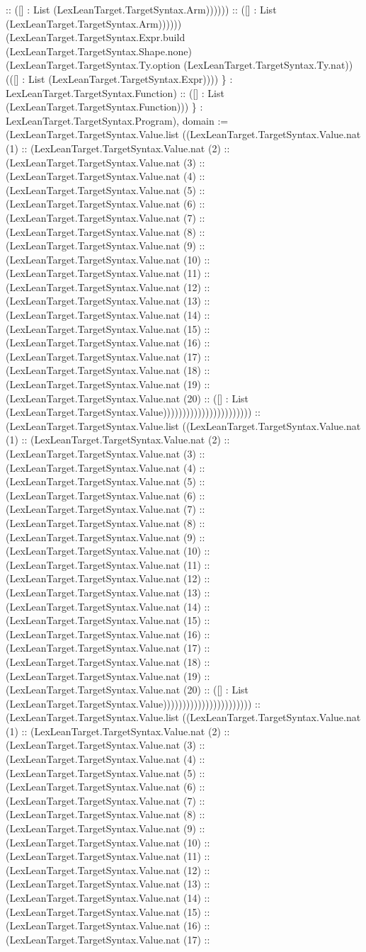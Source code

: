 \documentclass[11pt]{article}
\begin{document}
:: ([] : List (LexLeanTarget.TargetSyntax.Arm)))))) :: ([] : List (LexLeanTarget.TargetSyntax.Arm)))))) (LexLeanTarget.TargetSyntax.Expr.build (LexLeanTarget.TargetSyntax.Shape.none) (LexLeanTarget.TargetSyntax.Ty.option (LexLeanTarget.TargetSyntax.Ty.nat)) (([] : List (LexLeanTarget.TargetSyntax.Expr)))) \} : LexLeanTarget.TargetSyntax.Function) :: ([] : List (LexLeanTarget.TargetSyntax.Function))) \} : LexLeanTarget.TargetSyntax.Program), domain := (LexLeanTarget.TargetSyntax.Value.list ((LexLeanTarget.TargetSyntax.Value.nat (1) :: (LexLeanTarget.TargetSyntax.Value.nat (2) :: (LexLeanTarget.TargetSyntax.Value.nat (3) :: (LexLeanTarget.TargetSyntax.Value.nat (4) :: (LexLeanTarget.TargetSyntax.Value.nat (5) :: (LexLeanTarget.TargetSyntax.Value.nat (6) :: (LexLeanTarget.TargetSyntax.Value.nat (7) :: (LexLeanTarget.TargetSyntax.Value.nat (8) :: (LexLeanTarget.TargetSyntax.Value.nat (9) :: (LexLeanTarget.TargetSyntax.Value.nat (10) :: (LexLeanTarget.TargetSyntax.Value.nat (11) :: (LexLeanTarget.TargetSyntax.Value.nat (12) :: (LexLeanTarget.TargetSyntax.Value.nat (13) :: (LexLeanTarget.TargetSyntax.Value.nat (14) :: (LexLeanTarget.TargetSyntax.Value.nat (15) :: (LexLeanTarget.TargetSyntax.Value.nat (16) :: (LexLeanTarget.TargetSyntax.Value.nat (17) :: (LexLeanTarget.TargetSyntax.Value.nat (18) :: (LexLeanTarget.TargetSyntax.Value.nat (19) :: (LexLeanTarget.TargetSyntax.Value.nat (20) :: ([] : List (LexLeanTarget.TargetSyntax.Value))))))))))))))))))))))) :: (LexLeanTarget.TargetSyntax.Value.list ((LexLeanTarget.TargetSyntax.Value.nat (1) :: (LexLeanTarget.TargetSyntax.Value.nat (2) :: (LexLeanTarget.TargetSyntax.Value.nat (3) :: (LexLeanTarget.TargetSyntax.Value.nat (4) :: (LexLeanTarget.TargetSyntax.Value.nat (5) :: (LexLeanTarget.TargetSyntax.Value.nat (6) :: (LexLeanTarget.TargetSyntax.Value.nat (7) :: (LexLeanTarget.TargetSyntax.Value.nat (8) :: (LexLeanTarget.TargetSyntax.Value.nat (9) :: (LexLeanTarget.TargetSyntax.Value.nat (10) :: (LexLeanTarget.TargetSyntax.Value.nat (11) :: (LexLeanTarget.TargetSyntax.Value.nat (12) :: (LexLeanTarget.TargetSyntax.Value.nat (13) :: (LexLeanTarget.TargetSyntax.Value.nat (14) :: (LexLeanTarget.TargetSyntax.Value.nat (15) :: (LexLeanTarget.TargetSyntax.Value.nat (16) :: (LexLeanTarget.TargetSyntax.Value.nat (17) :: (LexLeanTarget.TargetSyntax.Value.nat (18) :: (LexLeanTarget.TargetSyntax.Value.nat (19) :: (LexLeanTarget.TargetSyntax.Value.nat (20) :: ([] : List (LexLeanTarget.TargetSyntax.Value))))))))))))))))))))))) :: (LexLeanTarget.TargetSyntax.Value.list ((LexLeanTarget.TargetSyntax.Value.nat (1) :: (LexLeanTarget.TargetSyntax.Value.nat (2) :: (LexLeanTarget.TargetSyntax.Value.nat (3) :: (LexLeanTarget.TargetSyntax.Value.nat (4) :: (LexLeanTarget.TargetSyntax.Value.nat (5) :: (LexLeanTarget.TargetSyntax.Value.nat (6) :: (LexLeanTarget.TargetSyntax.Value.nat (7) :: (LexLeanTarget.TargetSyntax.Value.nat (8) :: (LexLeanTarget.TargetSyntax.Value.nat (9) :: (LexLeanTarget.TargetSyntax.Value.nat (10) :: (LexLeanTarget.TargetSyntax.Value.nat (11) :: (LexLeanTarget.TargetSyntax.Value.nat (12) :: (LexLeanTarget.TargetSyntax.Value.nat (13) :: (LexLeanTarget.TargetSyntax.Value.nat (14) :: (LexLeanTarget.TargetSyntax.Value.nat (15) :: (LexLeanTarget.TargetSyntax.Value.nat (16) :: (LexLeanTarget.TargetSyntax.Value.nat (17) :: 
\end{document}
